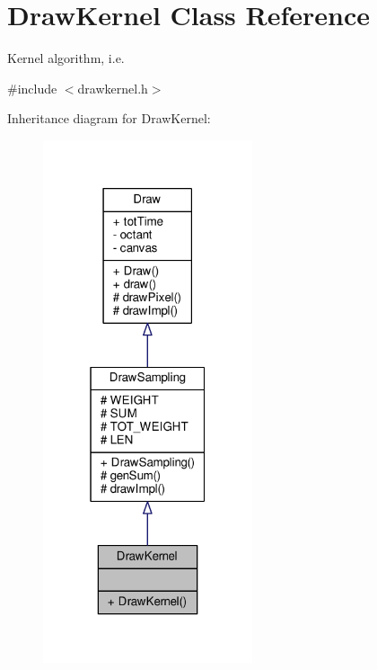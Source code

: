 \hypertarget{classDrawKernel}{}\section{Draw\+Kernel Class Reference}
\label{classDrawKernel}


Kernel algorithm, i.\+e.  




{\ttfamily \#include $<$drawkernel.\+h$>$}



Inheritance diagram for Draw\+Kernel\+:
\nopagebreak
\begin{figure}[H]
\begin{center}
\leavevmode
\includegraphics[width=175pt]{classDrawKernel__inherit__graph}
\end{center}
\end{figure}



